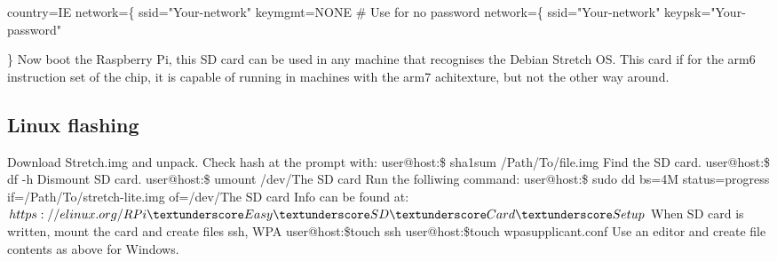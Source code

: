 \documentclass[a4paper,12pt]{article}
\begin{document}
country=IE
\newline\newline
network=\{
\newline
\hspace*{10mm}ssid="Your-network"
\newline
\hspace*{10mm}key\textunderscore mgmt=NONE \# Use for no password
\newline\newline
network=\{
\newline
\hspace*{10mm}ssid="Your-network"
\newline
\hspace*{10mm}key\textunderscore psk="Your-password"

\}
\newline\newline
Now boot the Raspberry Pi, this SD card can be used in any machine that recognises the Debian Stretch OS.
\newline
This card if for the arm6 instruction set of the chip, it is capable of running in machines with the arm7 achitexture, but not the other way around. 
\subsection{Linux flashing}
Download Stretch.img and unpack.
\newline
\newline
Check hash at the prompt with:
\newline
user@host:\raisebox{-1ex}{\textasciitilde}\$ sha1sum /Path/To/file.img
\newline
\newline
Find the SD card.
\newline
user@host:\raisebox{-0.9ex}{\textasciitilde}\$ df -h
\newline
\newline
Dismount SD card.
\newline
user@host:\raisebox{-0.9ex}{\textasciitilde}\$ umount /dev/The SD card
\newline
\newline
Run the folliwing command:
\newline
user@host:\raisebox{-0.9ex}{\textasciitilde}\$ sudo dd bs=4M status=progress if=\raisebox{-1ex}{\textasciitilde}/Path/To/stretch-lite.img  of=/dev/The SD card
\newline
\newline
Info can be found at:
\newline
$https://elinux.org/RPi\textunderscore Easy\textunderscore SD\textunderscore Card\textunderscore Setup$
\newline
\newline
When SD card is written, mount the card and create files ssh, WPA
\newline
user@host:\raisebox{-0.9ex}{\textasciitilde}\$touch ssh
\newline
user@host:\raisebox{-0.9ex}{\textasciitilde}\$touch wpa\textunderscore supplicant.conf
\newline
\newline
Use an editor and create file contents as above for Windows.
\end{document}
